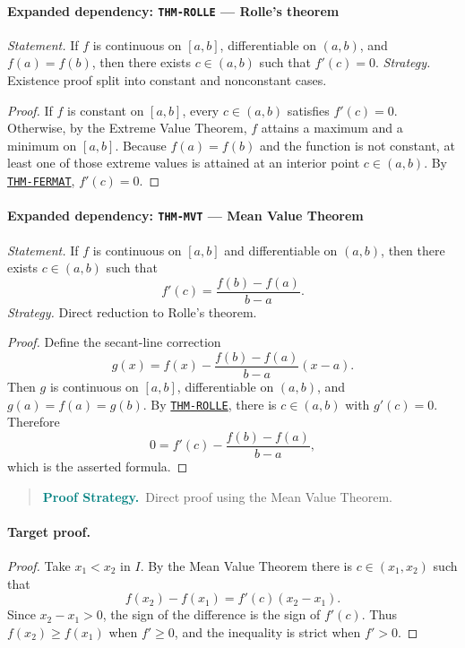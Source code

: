 \documentclass[10pt]{article}
\newcommand{\pidraw}[1]{\begingroup\urlstyle{tt}\nolinkurl{#1}\endgroup}
\newcommand{\pidref}[1]{\hyperref[prf:#1]{\pidraw{#1}}}
\newcommand{\pid}[1]{\pidref{#1}}
\theoremstyle{definition}
\theoremstyle{remark}
\newenvironment{proofstrategy}
{\begin{quote}\small\noindent\textbf{\textcolor{teal}{Proof Strategy.}}\ }
{\end{quote}}
\begin{document}
\paragraph{Expanded dependency: \pidraw{THM-ROLLE} --- Rolle's theorem}
\textit{Statement.} If $f$ is continuous on $[a,b]$, differentiable on $(a,b)$, and $f(a)=f(b)$, then there exists $c\in(a,b)$ such that $f'(c)=0$.
\textit{Strategy.} Existence proof split into constant and nonconstant cases.
\begin{proof}If $f$ is constant on $[a,b]$, every $c\in(a,b)$ satisfies $f'(c)=0$.
Otherwise, by the Extreme Value Theorem, $f$ attains a maximum and a minimum
on $[a,b]$. Because $f(a)=f(b)$ and the function is not constant, at least one
of those extreme values is attained at an interior point $c\in(a,b)$.
By \pid{THM-FERMAT}, $f'(c)=0$.\end{proof}

\paragraph{Expanded dependency: \pidraw{THM-MVT} --- Mean Value Theorem}
\textit{Statement.} If $f$ is continuous on $[a,b]$ and differentiable on $(a,b)$, then there exists $c\in(a,b)$ such that
\[
f'(c)=\frac{f(b)-f(a)}{b-a}.
\]
\textit{Strategy.} Direct reduction to Rolle's theorem.
\begin{proof}Define the secant-line correction
\[
g(x)=f(x)-\frac{f(b)-f(a)}{b-a}(x-a).
\]
Then $g$ is continuous on $[a,b]$, differentiable on $(a,b)$, and
$g(a)=f(a)=g(b)$. By \pid{THM-ROLLE}, there is $c\in(a,b)$ with $g'(c)=0$.
Therefore
\[
0=f'(c)-\frac{f(b)-f(a)}{b-a},
\]
which is the asserted formula.\end{proof}

\begin{proofstrategy}Direct proof using the Mean Value Theorem.\end{proofstrategy}

\paragraph{Target proof.}

\begin{proof}

Take $x_1<x_2$ in $I$. By the Mean Value Theorem there is $c\in(x_1,x_2)$ such that
\[
f(x_2)-f(x_1)=f'(c)(x_2-x_1).
\]
Since $x_2-x_1>0$, the sign of the difference is the sign of $f'(c)$.
Thus $f(x_2)\ge f(x_1)$ when $f'\ge0$, and the inequality is strict when
$f'>0$.

\end{proof}
\end{document}
